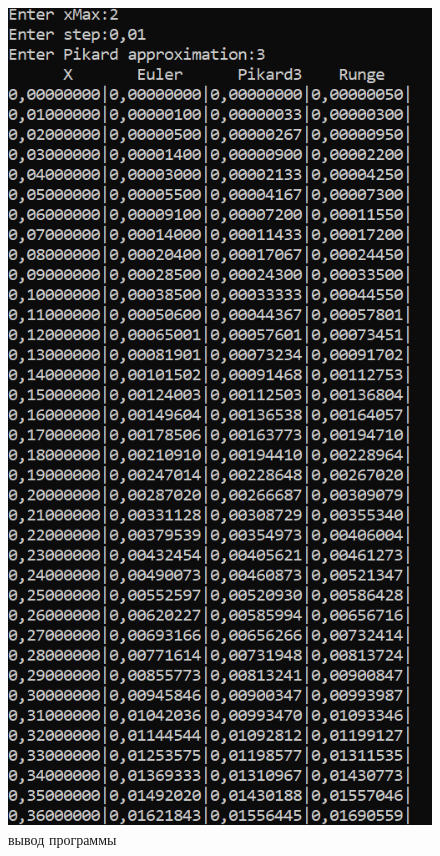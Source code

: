 \begin{figure}[ht!]
  \centering
  \includegraphics[scale=1]{img/result_table1.png}
  \caption{вывод программы}
  \label{fig:fig2}
\end{figure}

